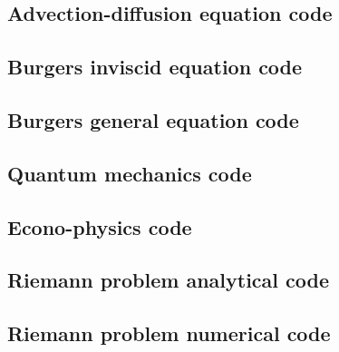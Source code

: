 \documentclass[twocolumn]{myarticle}
\begin{document}

\vspace{10pt}

\subsection{Advection-diffusion equation code}
\label{subsec:advection_diffusion_equation_code}


\vspace{10pt}

\subsection{Burgers inviscid equation code}
\label{subsec:burgers_inviscid_equation_code}


\vspace{10pt}

\subsection{Burgers general equation code}
\label{subsec:burgers_general_equation_code}


\vspace{10pt}

\subsection{Quantum mechanics code}
\label{subsec:quantum_mechanics_code}


\vspace{10pt}

\subsection{Econo-physics code}
\label{subsec:econo_physics_code}


\vspace{10pt}

\subsection{Riemann problem analytical code}
\label{subsec:riemann_problem_analytical_code}


\vspace{10pt}

\subsection{Riemann problem numerical code}
\label{subsec:riemann_problem_numerical_code}


\vspace{10pt}
\end{document}
